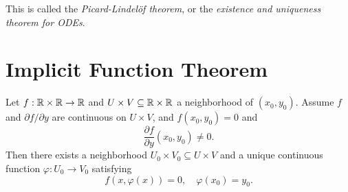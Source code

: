 \begin{remark}
  This is called the \emph{Picard-Lindel\"of theorem},
  or the \emph{existence and uniqueness theorem for ODEs}.
\end{remark}

\section{Implicit Function Theorem}
\begin{example}
  Let $f : \mathbb{R} \times \mathbb{R} \to \mathbb{R}$ and $U \times V \subseteq \mathbb{R} \times \mathbb{R}$ a
  neighborhood of $(x_0, y_0)$. Assume $f$ and
  $\partial f / \partial y$ are continuous on
  $U \times V$, and $f(x_0, y_0) = 0$ and
  \[
    \frac{\partial f}{\partial y}(x_0, y_0) \ne 0.
  \]
  Then there exists a neighborhood
  $U_0 \times V_0 \subseteq U \times V$ and a unique
  continuous function
  $\varphi : U_0 \to V_0$ satisfying
  \[
    f(x, \varphi(x)) = 0, \quad \varphi(x_0) = y_0.
  \]
\end{example}

